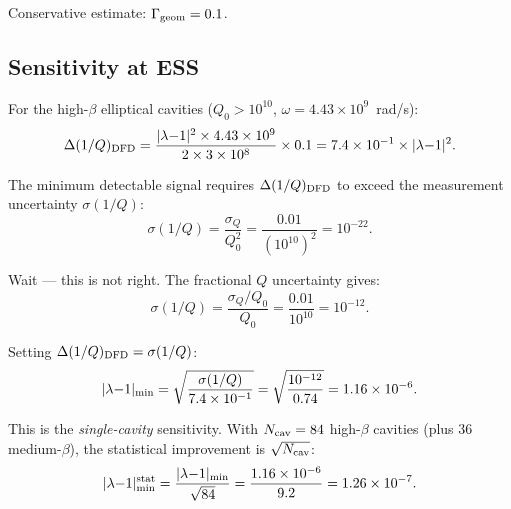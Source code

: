 \documentclass[11pt]{article}
\newcommand{\ee}[1]{\times 10^{#1}}
\newcommand{\lamdiff}{|\lambda{-}1|}
\begin{document}
Conservative estimate: $\Gamma_{\rm geom} = 0.1$.

\subsection{Sensitivity at ESS}

For the high-$\beta$ elliptical cavities ($Q_0 > 10^{10}$,
$\omega = 4.43\ee{9}$~rad/s):
\begin{equation}
\Delta(1/Q)_{\rm DFD}
= \frac{\lamdiff^2\times 4.43\ee{9}}{2\times 3\ee{8}}\times 0.1
= 7.4\ee{-1}\times\lamdiff^2.
\label{eq:sensitivity-num}
\end{equation}

The minimum detectable signal requires $\Delta(1/Q)_{\rm DFD}$ to
exceed the measurement uncertainty $\sigma(1/Q)$:
\begin{equation}
\sigma(1/Q) = \frac{\sigma_Q}{Q_0^2}
= \frac{0.01}{(10^{10})^2} = 10^{-22}.
\label{eq:sigma-1Q}
\end{equation}

Wait --- this is not right. The fractional $Q$ uncertainty gives:
\begin{equation}
\sigma(1/Q) = \frac{\sigma_Q/Q_0}{Q_0}
= \frac{0.01}{10^{10}} = 10^{-12}.
\label{eq:sigma-1Q-correct}
\end{equation}

Setting $\Delta(1/Q)_{\rm DFD} = \sigma(1/Q)$:
\begin{equation}
\lamdiff_{\rm min} = \sqrt{\frac{\sigma(1/Q)}{7.4\ee{-1}}}
= \sqrt{\frac{10^{-12}}{0.74}} = 1.16\ee{-6}.
\label{eq:lam-min-basic}
\end{equation}

This is the \emph{single-cavity} sensitivity. With $N_{\rm cav} = 84$
high-$\beta$ cavities (plus 36 medium-$\beta$), the statistical
improvement is $\sqrt{N_{\rm cav}}$:
\begin{equation}
\lamdiff_{\rm min}^{\rm stat}
= \frac{\lamdiff_{\rm min}}{\sqrt{84}}
= \frac{1.16\ee{-6}}{9.2} = 1.26\ee{-7}.
\label{eq:lam-min-stat}
\end{equation}
\end{document}
